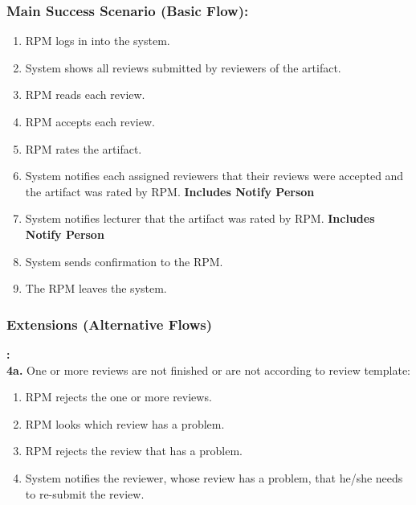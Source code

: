     
    
    \subsubsection*{Main Success Scenario (Basic Flow):}
    \begin{enumerate}
        \itemsep-1em 
        \item RPM logs in into the system.
        \item  System shows all reviews submitted by reviewers of the artifact.
        \item  RPM reads each review.
        \item  RPM accepts each review.
        \item  RPM rates the artifact.
        \item  System notifies each assigned reviewers that their reviews were accepted and the artifact was rated by RPM. \textbf{Includes Notify Person}
        \item  System notifies lecturer that the artifact was rated by RPM. \textbf{Includes Notify Person}
        \item  System sends confirmation to the RPM.
       \item  The RPM leaves the system.
    \end{enumerate}
    
    
    
    
     \subsubsection*{Extensions (Alternative Flows)}\textbf{:}
     \newline
     \\
     \textbf{4a.} One or more reviews are not finished or are not according to review template:
     \begin{enumerate}
         \itemsep-1em 
        \item RPM rejects the one or more reviews.
        \item RPM looks which review has a problem.
        \item RPM rejects the review that has a problem.
        \item System  notifies  the  reviewer,  whose  review  has  a  problem,  that  he/she  needs  to  re-submit  the review.
    \end{enumerate}

            
        
        \newpage



